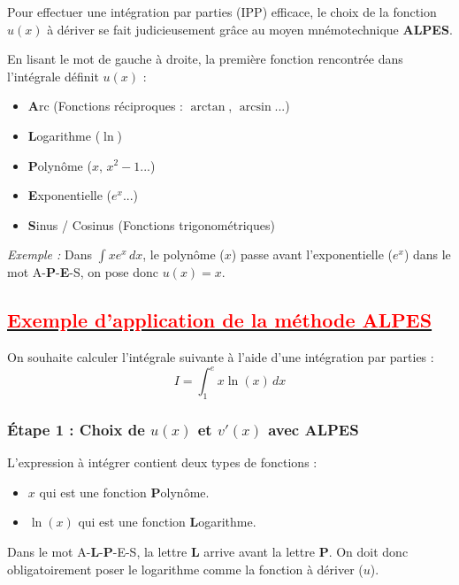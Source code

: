 \documentclass[12pt,a4paper]{article}
\begin{document}
\begin{tcolorbox}[
    colframe=red, %
    colback=white, %
    title=\textbf{Remarque : Choix de $u(x)$ (Méthode ALPES)}, 
    coltitle=white, %
    fonttitle=\bfseries,
    arc=2mm %
]
Pour effectuer une intégration par parties (IPP) efficace, le choix de la fonction $u(x)$ à dériver se fait judicieusement grâce au moyen mnémotechnique \textbf{ALPES}. 

En lisant le mot de gauche à droite, la première fonction rencontrée dans l'intégrale définit $u(x)$ :
\begin{itemize}
    \item[\textbf{A} :] \textbf{A}rc (Fonctions réciproques : $\arctan$, $\arcsin$...)
    \item[\textbf{L} :] \textbf{L}ogarithme ($\ln$)
    \item[\textbf{P} :] \textbf{P}olynôme ($x$, $x^2-1$...)
    \item[\textbf{E} :] \textbf{E}xponentielle ($e^x$...)
    \item[\textbf{S} :] \textbf{S}inus / Cosinus (Fonctions trigonométriques)
\end{itemize}
\textit{Exemple :} Dans $\int x e^x \,dx$, le polynôme ($x$) passe avant l'exponentielle ($e^x$) dans le mot A-\textbf{P}-\textbf{E}-S, on pose donc $u(x) = x$.
\end{tcolorbox}

\subsection*{\underline{\textbf{\textcolor{red}{Exemple d'application de la méthode ALPES}}}}

On souhaite calculer l'intégrale suivante à l'aide d'une intégration par parties :
\[ I = \int_{1}^{e} x \ln(x) \, dx \]

\subsubsection*{Étape 1 : Choix de $u(x)$ et $v'(x)$ avec ALPES}
L'expression à intégrer contient deux types de fonctions :
\begin{itemize}
    \item $x$ qui est une fonction \textbf{P}olynôme.
    \item $\ln(x)$ qui est une fonction \textbf{L}ogarithme.
\end{itemize}
Dans le mot A-\textbf{L}-\textbf{P}-E-S, la lettre \textbf{L} arrive avant la lettre \textbf{P}. On doit donc obligatoirement poser le logarithme comme la fonction à dériver ($u$).
\end{document}

